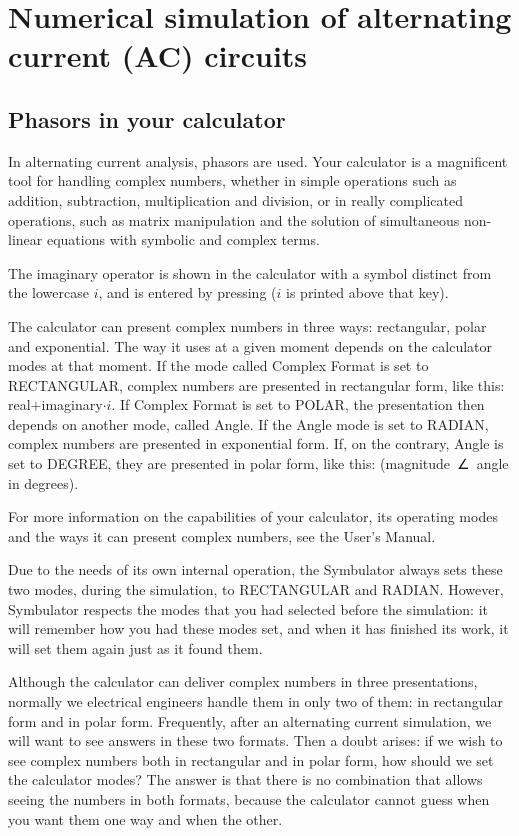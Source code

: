 
\chapter{Numerical simulation of alternating current (AC) circuits}

\section{Phasors in your calculator}

In alternating current analysis, phasors are used. Your calculator
is a magnificent tool for handling complex numbers, whether in
simple operations such as addition, subtraction, multiplication and
division, or in really complicated operations, such as matrix
manipulation and the solution of simultaneous non-linear equations
with symbolic and complex terms.

The imaginary operator is shown in the calculator with a symbol
distinct from the lowercase $i$, and is entered by pressing
  ($i$ is printed above that key).

The calculator can present complex numbers in three ways:
rectangular, polar and exponential. The way it uses at a given
moment depends on the calculator modes at that moment. If the mode
called Complex Format is set to RECTANGULAR, complex numbers are
presented in rectangular form, like this: real$+$imaginary$\cdot i$.
If Complex Format is set to POLAR, the presentation then depends on
another mode, called Angle. If the Angle mode is set to RADIAN,
complex numbers are presented in exponential form. If, on the
contrary, Angle is set to DEGREE, they are presented in polar form,
like this: (magnitude~∠~angle in degrees).

For more information on the capabilities of your calculator, its
operating modes and the ways it can present complex numbers, see the
User's Manual.

Due to the needs of its own internal operation, the Symbulator
always sets these two modes, during the simulation, to RECTANGULAR
and RADIAN. However, Symbulator respects the modes that you had
selected before the simulation: it will remember how you had these
modes set, and when it has finished its work, it will set them again
just as it found them.

Although the calculator can deliver complex numbers in three
presentations, normally we electrical engineers handle them in only
two of them: in rectangular form and in polar form. Frequently,
after an alternating current simulation, we will want to see answers
in these two formats. Then a doubt arises: if we wish to see complex
numbers both in rectangular and in polar form, how should we set the
calculator modes? The answer is that there is no combination that
allows seeing the numbers in both formats, because the calculator
cannot guess when you want them one way and when the other.

